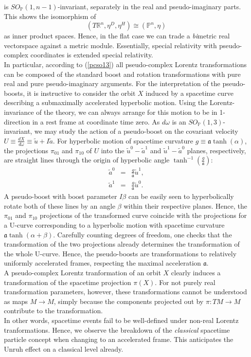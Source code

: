 \documentclass[11pt,a4paper,twoside]{article}
\newcommand{\reals}{\mathbb{R}}
\newcommand{\pc}{\mathbb{P}}
\begin{document}
is $SO_\pc(1,n-1)$-invariant, separately in the real and
pseudo-imaginary parts. This shows the isomorphism of
\begin{equation}
  \left(T\reals^n, \eta^D, \eta^H\right) \cong \left(\pc^n, \eta\right)
\end{equation}
as inner product spaces. Hence, in the flat case we can trade a
\textsl{bi}metric real vectorspace against a metric module. Essentially, special relativity with pseudo-complex coordinates is extended special relativity.\\
In particular, according to (\ref{pcso13}) all pseudo-complex Lorentz
transformations can be composed of the standard boost and rotation
transformations with pure real and pure pseudo-imaginary arguments.
For the interpretation of the pseudo-boosts, it is instructive to
consider the orbit $X$ induced by a spacetime curve describing a
submaximally accelerated hyperbolic motion. Using the
Lorentz-invariance of the theory, we can always arrange for this
motion to be in 1-direction in a rest frame at coordinate
time zero. As $d\omega$ is an $SO_\pc(1,3)$-invariant, we may study the
action of a pseudo-boost on the covariant velocity $U \equiv
\frac{dX}{d\omega} \equiv \tilde u + I \tilde a$. For hyperbolic
motion of spacetime curvature $g\equiv \mathfrak{a}\tanh(\alpha)$, the projections $\pi_{01}$ and
$\pi_{10}$ of $U$ into the
$\tilde u^0 - \tilde a^1$ and $\tilde u^1 - \tilde a^0$ planes,
respectively,  are straight lines through the origin of hyperbolic angle
$\tanh^{-1}\left(\frac{g}{\mathfrak{a}}\right)$:
\begin{eqnarray}
  \tilde a^0 &=& \frac{g}{\mathfrak{a}} \tilde u^1,\\
  \tilde a^1 &=& \frac{g}{\mathfrak{a}} \tilde u^0.
\end{eqnarray}
A pseudo-boost with boost parameter $I\beta$ can be easily seen to
hyperbolically rotate both of these lines by an angle $\beta$ within their
respective planes. Hence, the $\pi_{01}$ and $\pi_{10}$ projections of
the transformed curve coincide with the projections for a U-curve
corresponding to a hyperbolic motion with spacetime curvature
$\mathfrak{a}\tanh(\alpha+\beta)$. Carefully counting degrees of
freedom, one checks that the transformation of the two projections
already determines the transformation of the whole U-curve. Hence, the
pseudo-boosts are transformations to relatively uniformly
accelerated frames, respecting the maximal acceleration
$\mathfrak{a}$.\\
A pseudo-complex Lorentz tranformation of an orbit $X$ clearly induces
a transformation of the spacetime projection $\pi(X)$. For not purely
real transformation parameters, however, these transformations cannot be
understood as maps $M \longrightarrow M$, simply because the
components projected out by $\pi: TM \longrightarrow M$ contribute to the transformation.\\
In other words, spacetime events fail to be well-defined under
non-real Lorentz tranformations. Hence, we observe the breakdown of
the \textsl{classical} spacetime particle concept when changing to an
accelerated frame. This anticipates the Unruh effect \cite{Unruh} on a
classical level already.
\end{document}
